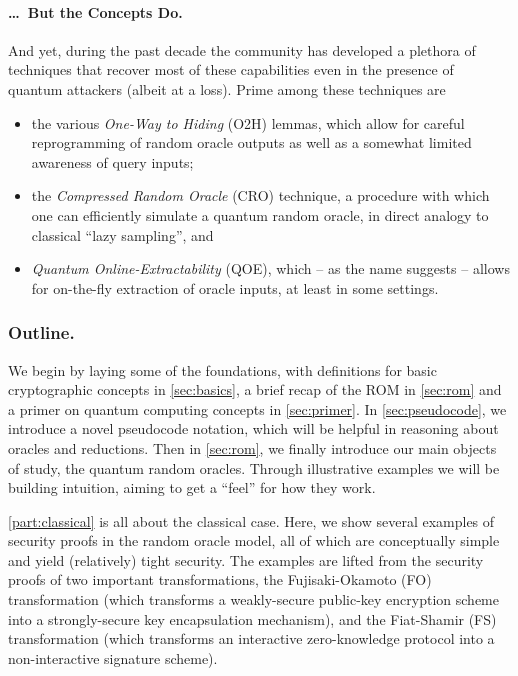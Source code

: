   \paragraph{\ldots\ But the Concepts Do.}
    And yet, during the past decade the community has developed a plethora of techniques
      that recover most of these capabilities even in the presence of quantum attackers
      (albeit at a loss).
      Prime among these techniques are
      \begin{itemize}
      	\item the various \emph{One-Way to Hiding} (O2H) lemmas,
      		which allow for careful reprogramming of random oracle outputs as well as a
      		somewhat limited awareness of query inputs; 
        \item the \emph{Compressed Random Oracle} (CRO) technique,
      		a procedure with which one can efficiently simulate a quantum random oracle,
      		in direct analogy to classical ``lazy sampling'', and 	
        \item \emph{Quantum Online-Extractability} (QOE),
      		which -- as the name suggests -- allows for on-the-fly extraction of oracle inputs,
      		at least in some settings.
      \end{itemize}

  \subsubsection{Outline.}
      We begin by laying some of the foundations,
      with definitions for basic cryptographic concepts in \cref{sec:basics},
      a brief recap of the ROM in \cref{sec:rom} 
      and a primer on quantum computing concepts in \cref{sec:primer}.
      In \cref{sec:pseudocode}, we introduce a novel pseudocode notation,
      which will be helpful in reasoning about oracles and reductions.
      Then in \cref{sec:rom}, we finally introduce our main objects of study,
      the quantum random oracles. Through illustrative examples we will be
      building intuition, aiming to get a ``feel'' for how they work.


    \cref{part:classical} is all about the classical case. Here, we show
      several examples of security proofs in the random oracle model, all of
      which are conceptually simple and yield (relatively) tight security.
      The examples are lifted from the security proofs of two important
      transformations, the Fujisaki-Okamoto (FO) transformation (which transforms
      a weakly-secure public-key encryption scheme into a strongly-secure key
      encapsulation mechanism), and the Fiat-Shamir (FS) transformation (which
      transforms an interactive zero-knowledge protocol into a non-interactive
      signature scheme). 

